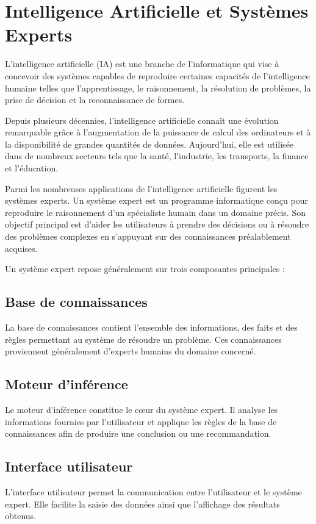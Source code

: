 \documentclass[a4paper,12pt]{report} %
\begin{document}
\section{Intelligence Artificielle et Systèmes Experts}

L'intelligence artificielle (IA) est une branche de l'informatique qui vise à concevoir des systèmes capables de reproduire certaines capacités de l'intelligence humaine telles que l'apprentissage, le raisonnement, la résolution de problèmes, la prise de décision et la reconnaissance de formes.

Depuis plusieurs décennies, l'intelligence artificielle connaît une évolution remarquable grâce à l'augmentation de la puissance de calcul des ordinateurs et à la disponibilité de grandes quantités de données. Aujourd'hui, elle est utilisée dans de nombreux secteurs tels que la santé, l'industrie, les transports, la finance et l'éducation.

Parmi les nombreuses applications de l'intelligence artificielle figurent les systèmes experts. Un système expert est un programme informatique conçu pour reproduire le raisonnement d'un spécialiste humain dans un domaine précis. Son objectif principal est d'aider les utilisateurs à prendre des décisions ou à résoudre des problèmes complexes en s'appuyant sur des connaissances préalablement acquises.

Un système expert repose généralement sur trois composantes principales :

\subsection*{Base de connaissances}
La base de connaissances contient l'ensemble des informations, des faits et des règles permettant au système de résoudre un problème. Ces connaissances proviennent généralement d'experts humains du domaine concerné.

\subsection*{Moteur d'inférence}
Le moteur d'inférence constitue le cœur du système expert. Il analyse les informations fournies par l'utilisateur et applique les règles de la base de connaissances afin de produire une conclusion ou une recommandation.

\subsection*{Interface utilisateur}
L'interface utilisateur permet la communication entre l'utilisateur et le système expert. Elle facilite la saisie des données ainsi que l'affichage des résultats obtenus.
\end{document}
